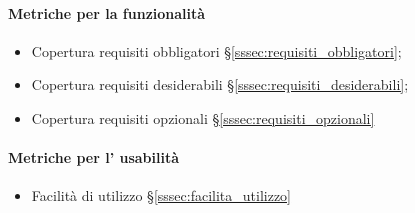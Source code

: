 \paragraph{Metriche per la funzionalità}
\begin{itemize}
    \item Copertura requisiti obbligatori §\ref{sssec:requisiti_obbligatori};
    \item Copertura requisiti desiderabili §\ref{sssec:requisiti_desiderabili};
    \item Copertura requisiti opzionali §\ref{sssec:requisiti_opzionali}
\end{itemize}
\paragraph{Metriche per l' usabilità}
\begin{itemize}
    \item Facilità di utilizzo §\ref{sssec:facilita_utilizzo}
\end{itemize}

